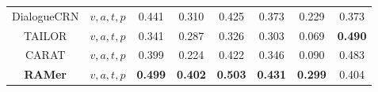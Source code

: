 \begin{table*}[t!]
\begin{center}
{\begin{tabular}{cc|ccc|ccc}
DialogueCRN     & $v,a,t,p$
& 0.441    & 0.310    & 0.425 
& 0.373    & 0.229    & 0.373 
\\
TAILOR               & $v,a,t,p$
& 0.341 & 0.287 & 0.326 
& 0.303 & 0.069 & \textbf{0.490} 
\\
CARAT              & $v,a,t,p$
& 0.399 & 0.224 & 0.422 
& 0.346 & 0.090 & 0.483 
\\
\hline
\textbf{RAMer}                   & $v,a,t,p$                  
& \textbf{0.499}    & \textbf{0.402}    & \textbf{0.503}       
& \textbf{0.431}    & \textbf{0.299}   & 0.404       
\\ 
\hline
\hline
\end{tabular}
} 
\end{center}
\end{table*}

